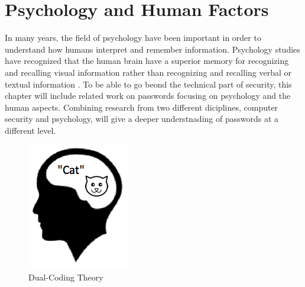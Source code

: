 \section{Psychology and Human Factors}\label{sec:humanfactors}

	In many years, the field of psychology have been important in order to understand how humans interpret and remember information. Psychology studies have recognized that the human brain have a superior memory for recognizing and recalling visual information rather than recognizing and recalling verbal or textual information \cite{DeAngeli}. To be able to go beond the technical part of security, this chapter will include related work on passwords focusing on psychology and the human aspects. Combining research from two different diciplines, computer security and psychology, will give a deeper understnading of passwords at a different level. 

		\begin{figure}
      \vspace{-10pt}
      \begin{center}
        \includegraphics[scale=0.5]{pics/review/dualCoding.png}
      \end{center}
      \vspace{-10pt}
      \caption{Dual-Coding Theory}
      \vspace{-10pt}
      \label{fig:dualcoding}
    \end{figure}

